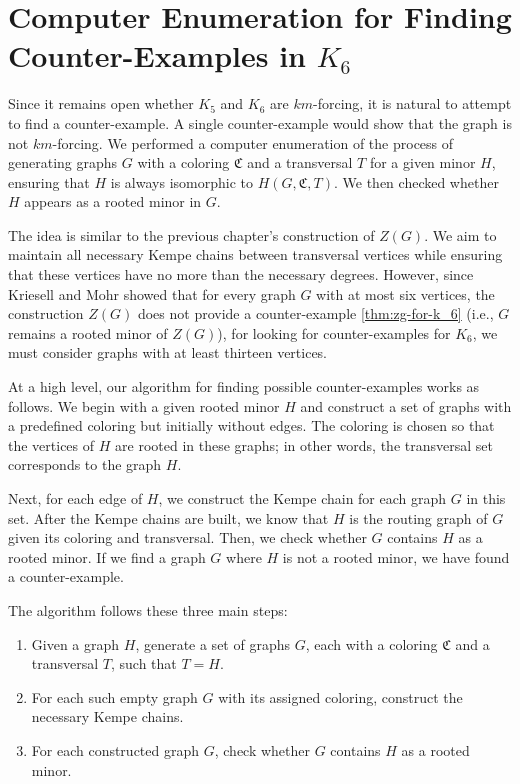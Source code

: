 \chapter{Computer Enumeration for Finding Counter-Examples in \( K_6 \)}

Since it remains open whether \( K_5 \) and \( K_6 \) are \( km \)-forcing, it is natural to attempt to find a counter-example.
A single counter-example would show that the graph is not \( km \)-forcing.
We performed a computer enumeration of the process of generating graphs \( G \) with a coloring \( \mathfrak{C} \) and a transversal \( T \) for a given minor \( H \),
ensuring that \( H \) is always isomorphic to \( H(G, \mathfrak{C}, T) \). We then checked whether \( H \) appears as a rooted minor in \( G \).

The idea is similar to the previous chapter's construction of \( Z(G) \). 
We aim to maintain all necessary Kempe chains between transversal vertices while ensuring that these vertices have no more than the necessary degrees.
However, since Kriesell and Mohr \cite{matthias_2022} showed that for every graph \( G \) with at most six vertices, the construction \( Z(G) \) does not
provide a counter-example \ref{thm:zg-for-k_6} (i.e., \( G \) remains a rooted minor of \( Z(G) \)), for looking for counter-examples 
for $K_6$, we must consider graphs with at least thirteen vertices.

At a high level, our algorithm for finding possible counter-examples works as follows.
We begin with a given rooted minor \( H \) and construct a set of graphs with a predefined coloring but initially without edges.
The coloring is chosen so that the vertices of \( H \) are rooted in these graphs; in other words, the transversal set corresponds to the graph \( H \). 

Next, for each edge of $H$, we construct the Kempe chain for each graph \( G \) in this set. After the Kempe chains are built, 
we know that \( H \) is the routing graph of \( G \) given its coloring and transversal. 
Then, we check whether \( G \) contains \( H \) as a rooted minor. 
If we find a graph \( G \) where \( H \) is not a rooted minor, we have found a counter-example.

The algorithm follows these three main steps:
\begin{enumerate}
    \item Given a graph \( H \), generate a set of graphs \( G \), each with a coloring \( \mathfrak{C} \) and a transversal \( T \), such that \( T = H \).
    \item For each such empty graph \( G \) with its assigned coloring, construct the necessary Kempe chains.
    \item For each constructed graph \( G \), check whether \( G \) contains \( H \) as a rooted minor.
\end{enumerate}

